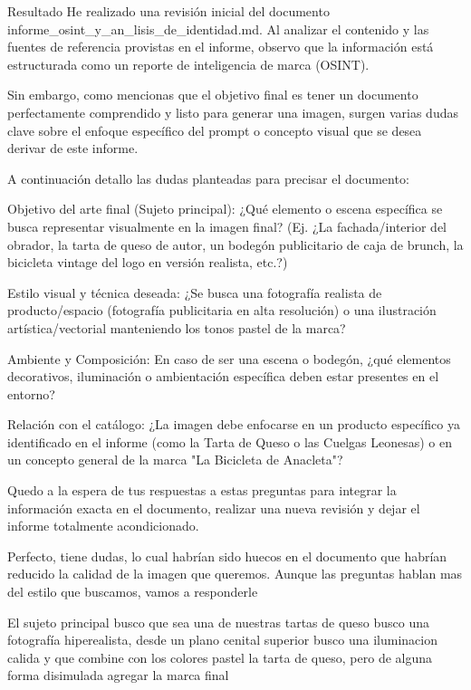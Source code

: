 \documentclass[12pt,a4paper]{article}
\begin{document}
\begin{result}{Resultado}
    He realizado una revisión inicial del documento informe_osint_y_an_lisis_de_identidad.md. Al analizar el contenido y las fuentes de referencia provistas en el informe, observo que la información está estructurada como un reporte de inteligencia de marca (OSINT).

Sin embargo, como mencionas que el objetivo final es tener un documento perfectamente comprendido y listo para generar una imagen, surgen varias dudas clave sobre el enfoque específico del prompt o concepto visual que se desea derivar de este informe.

A continuación detallo las dudas planteadas para precisar el documento:

    Objetivo del arte final (Sujeto principal): ¿Qué elemento o escena específica se busca representar visualmente en la imagen final? (Ej. ¿La fachada/interior del obrador, la tarta de queso de autor, un bodegón publicitario de caja de brunch, la bicicleta vintage del logo en versión realista, etc.?)

    Estilo visual y técnica deseada: ¿Se busca una fotografía realista de producto/espacio (fotografía publicitaria en alta resolución) o una ilustración artística/vectorial manteniendo los tonos pastel de la marca?

    Ambiente y Composición: En caso de ser una escena o bodegón, ¿qué elementos decorativos, iluminación o ambientación específica deben estar presentes en el entorno?

    Relación con el catálogo: ¿La imagen debe enfocarse en un producto específico ya identificado en el informe (como la Tarta de Queso o las Cuelgas Leonesas) o en un concepto general de la marca "La Bicicleta de Anacleta"?

Quedo a la espera de tus respuestas a estas preguntas para integrar la información exacta en el documento, realizar una nueva revisión y dejar el informe totalmente acondicionado.
\end{result}

Perfecto, tiene dudas, lo cual habrían sido huecos en el documento que habrían reducido la calidad de la imagen que queremos. Aunque las preguntas hablan mas del estilo que buscamos, vamos a responderle

\begin{promptbox}
     El sujeto principal busco que sea una de nuestras tartas de queso
    busco una fotografía hiperealista, desde un plano cenital superior
    busco una iluminacion calida y que combine con los colores pastel
    la tarta de queso, pero de alguna forma disimulada agregar la marca final 
\end{promptbox}
\end{document}
